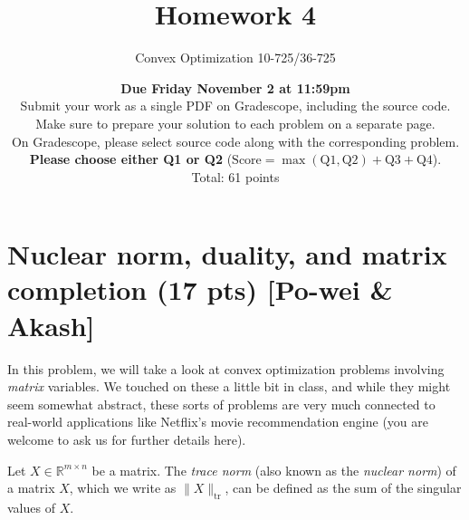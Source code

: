 \documentclass{article}
\theoremstyle{remark}
\theoremstyle{definition}
\newcommand{\reals}{\mathbb R}
\def\tr{\mathrm{tr}}
\begin{document}
\title{Homework 4}

\author{\Large Convex Optimization 10-725/36-725}
\date{{\bf Due Friday November 2 at 11:59pm} \\
Submit your work as a single PDF on Gradescope, including the source code.\\
Make sure to prepare your solution to each problem on a separate page.  \\
On Gradescope, please select source code along with the corresponding problem. \\
\textbf{Please choose either Q1 or Q2} ($\text{Score}=\max(\text{Q1},\text{Q2})+\text{Q3}+\text{Q4}$).\\
\bigskip 
Total: 61 points}

\maketitle

\section{Nuclear norm, duality, and matrix completion (17 pts) [Po-wei \& Akash]}

\newcommand{\symm}{\mathbb{S}}

In this problem, we will take a look at convex optimization problems involving \textit{matrix} variables.  We touched on these a little bit in class, and while they might seem somewhat abstract, these sorts of problems are very much connected to real-world applications like Netflix's movie recommendation engine (you are welcome to ask us for further details here).

Let $X \in \reals^{m \times n}$ be a matrix.  The \textit{trace norm} (also known as the \textit{nuclear norm}) of a matrix $X$, which we write as $\| X \|_{\tr}$, can be defined as the sum of the singular values of $X$.
\end{document}
